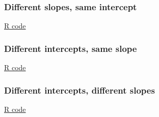 \documentclass[handout]{beamer}
\begin{document}
   \begin{frame}
   \frametitle{Different slopes, same intercept}
   \begin{center}
   \end{center}
   \href{http://stats191.stanford.edu/interactions.html#minority-employment-data}{R code}
   \end{frame}



   \begin{frame}
   \frametitle{Different intercepts, same slope}
   \begin{center}
   \end{center}
   \href{http://stats191.stanford.edu/interactions.html#minority-employment-data}{R code}
   \end{frame}



   \begin{frame}
   \frametitle{Different intercepts, different slopes}
   \begin{center}
   \end{center}
   \href{http://stats191.stanford.edu/interactions.html#minority-employment-data}{R code}
   \end{frame}

\end{document}
